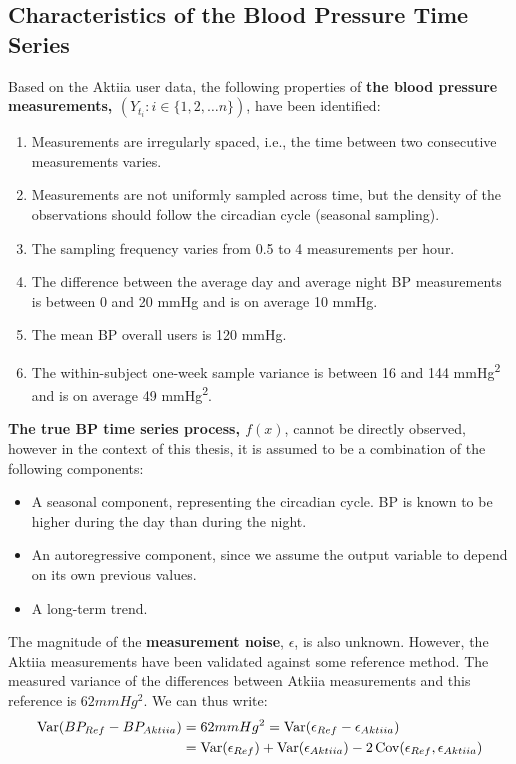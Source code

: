 \subsection{Characteristics of the Blood Pressure Time Series}\label{sec:characteristics-of-the-blood-pressure-time-series}

Based on the Aktiia user data, the following properties of \textbf{the
blood pressure measurements, $(Y_{t_i}: i \in \{1, 2, \dots n\})$}, have been identified:

\begin{enumerate}
    \item Measurements are irregularly spaced, i.e., the time between two
    consecutive measurements varies.
    \item Measurements are not uniformly sampled across time, but the density of
    the observations should follow the circadian cycle (seasonal sampling).
    \item The sampling frequency varies from 0.5 to 4 measurements per hour.
    \item The difference between the average day and average night BP measurements
    is between 0 and 20 mmHg and is on average 10 mmHg.
    \item The mean BP overall users is 120 mmHg.
    \item The within-subject one-week sample variance is between 16 and 144
    mmHg\textsuperscript{2} and is on average 49 mmHg\textsuperscript{2}.
\end{enumerate}


\textbf{The true BP time series process, $f(x)$}, cannot be directly observed,
however in the context of this thesis, it
is assumed to be a combination of the following components:

\begin{itemize}
    \item A seasonal component, representing the circadian cycle. BP is known to
    be higher during the day than during the night.
    \item An autoregressive component, since we assume the output variable to
    depend on its own previous values.
    \item A long-term trend.
\end{itemize}


The magnitude of the \textbf{measurement noise}, $\epsilon$, is also unknown.
However, the Aktiia measurements have been validated against some
reference method.
The measured variance of the differences between Atkiia measurements
and this reference is $62 mmHg^2$.
We can thus write:
\begin{align*}
    \operatorname{Var}(BP_{Ref} - BP_{Aktiia})
    & = 62 mmHg^2 = \operatorname{Var}(\epsilon_{Ref} - \epsilon_{Aktiia}) \\
    & = \operatorname{Var}(\epsilon_{Ref}) + \operatorname{Var}(\epsilon_{Aktiia}) - 2\operatorname{Cov}(\epsilon_{Ref},
    \epsilon_{Aktiia})
\end{align*}

